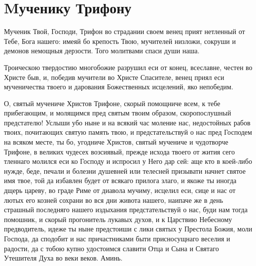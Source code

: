 \section{Mученику Трифону}\begin{mymulticols}


Мученик Твой, Господи, Трифон во страдании своем венец прият нетленный от Тебе, Бога нашего: имеяй бо крепость Твою, мучителей низложи, сокруши и демонов немощныя дерзости. Того молитвами спаси души наша.


Троическою твердостию многобожие разрушил еси от конец, всеславне, честен во Христе быв, и, победив мучители во Христе Спасителе, венец приял еси мученичества твоего и дарования Божественных исцелений, яко непобедим.


О, святый мучениче Христов Трифоне, скорый помощниче всем, к тебе прибегающим, и молящимся пред святым твоим образом, скоропослушный предстателю! Услыши убо ныне и на всякий час моление нас, недостойных рабов твоих, почитающих святую память твою, и предстательствуй о нас пред Господем на всяком месте, ты бо, угодниче Христов, святый мучениче и чудотворче Трифоне, в великих чудесех возсиявый, прежде исхода твоего от жития сего тленнаго молился еси ко Господу и испросил у Него дар сей: аще кто в коей-либо нужде, беде, печали и болезни душевней или телесней призывати начнет святое имя твое, той да избавлен будет от всякаго прилога злаго, и якоже ты иногда дщерь цареву,  во граде Риме от диавола мучиму, исцелил еси, сице и нас от лютых его козней сохрани во вся дни живота нашего, наипаче же в день страшный последняго нашего издыхания предстательствуй о нас, буди нам тогда помошник, и скорый прогонитель лукавых духов, и к Царствию Небесному предводитель, идеже ты ныне предстоиши с лики святых у Престола Божия, моли Господа, да сподобит и нас причастниками быти присносущнаго веселия и радости, да с тобою купно удостоимся славити Отца и Сына и Святаго Утешителя Духа во веки веков. Аминь.

\end{mymulticols}

